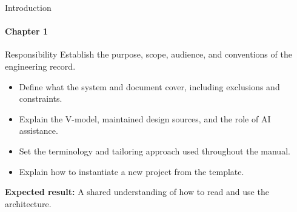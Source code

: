 \begin{frame}{Introduction}
\framesubtitle{Chapter 1}
\begin{block}{Responsibility}
Establish the purpose, scope, audience, and conventions of the engineering record.
\end{block}
\begin{itemize}
  \item Define what the system and document cover, including exclusions and constraints.
  \item Explain the V-model, maintained design sources, and the role of AI assistance.
  \item Set the terminology and tailoring approach used throughout the manual.
  \item Explain how to instantiate a new project from the template.
\end{itemize}
\vspace{0.15cm}
\textbf{Expected result:} A shared understanding of how to read and use the architecture.
\end{frame}
